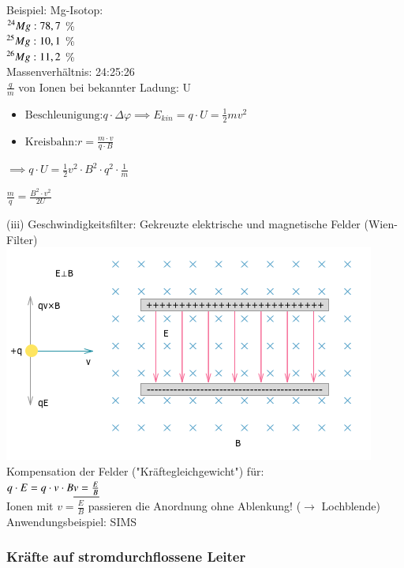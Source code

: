   Beispiel: Mg-Isotop:\\ \indent\indent $\prescript{24}{}{Mg}:78,7$ \% \\ \indent\indent $ \prescript{25}{}{Mg}: 10,1 $ \% \\ \indent\indent $ \prescript{26}{}{Mg}: 11,2 $ \% \\
  Massenverhältnis: 24:25:26\\
  
  $\frac{q}{m}$ von Ionen bei bekannter Ladung: U
  \begin{itemize}
  	 \item$ \text{Beschleunigung:} q\cdot\Delta\varphi\implies E_{kin}=q\cdot U= \frac{1}{2}mv^2 $\\
  	 \item$ \text{Kreisbahn:} r=\frac{m\cdot v}{q\cdot B} $
  \end{itemize}
  
  $\implies q\cdot U= \frac{1}{2}v^2\cdot B^2\cdot q^2\cdot \frac{1}{m}$
  
  $\boxed{\frac{m}{q}=\frac{B^2\cdot v^2}{2U}}$
  
  (iii) Geschwindigkeitsfilter: Gekreuzte elektrische und magnetische Felder (Wien-Filter)\\
  
  \includegraphics[width=0.7\linewidth]{skizzen/16/16_1B06}\\
  
  Kompensation der Felder ("Kräftegleichgewicht") für:\\
  $q\cdot E=q\cdot v\cdot B\\ \underline{v=\frac{E}{B}}$\\
  Ionen mit $v=\frac{E}{B}$ passieren die Anordnung ohne Ablenkung! ($\rightarrow$ Lochblende)\\
  Anwendungsbeispiel: SIMS\\
  
  \subsubsection{Kräfte auf stromdurchflossene Leiter}\leavevmode \\
  
